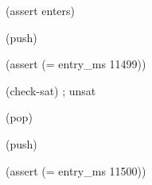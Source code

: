 \documentclass[11pt,a4paper]{article}
\begin{document}
\begin{minipage}{\linewidth}
{\begin{minipage}{\dimexpr\linewidth-2\fboxsep-2\fboxrule\relax}
\noindent{}\hspace{.8em}\parbox[t]{\dimexpr\linewidth-2.8em\relax}{\raggedright\ttfamily\fontsize{8.2}{10.5}\selectfont \hspace*{0.0em}(assert enters)\strut}\par\vspace{1pt}
\noindent{}\hspace{.8em}\parbox[t]{\dimexpr\linewidth-2.8em\relax}{\raggedright\ttfamily\fontsize{8.2}{10.5}\selectfont \hspace*{0.0em}(push)\strut}\par\vspace{1pt}
\noindent{}\hspace{.8em}\parbox[t]{\dimexpr\linewidth-2.8em\relax}{\raggedright\ttfamily\fontsize{8.2}{10.5}\selectfont \hspace*{0.0em}(assert (= entry\_ms 11499))\strut}\par\vspace{1pt}
\noindent{}\hspace{.8em}\parbox[t]{\dimexpr\linewidth-2.8em\relax}{\raggedright\ttfamily\fontsize{8.2}{10.5}\selectfont \hspace*{0.0em}(check-sat) ; unsat\strut}\par\vspace{1pt}
\noindent{}\hspace{.8em}\parbox[t]{\dimexpr\linewidth-2.8em\relax}{\raggedright\ttfamily\fontsize{8.2}{10.5}\selectfont \hspace*{0.0em}(pop)\strut}\par\vspace{1pt}
\noindent{}\hspace{.8em}\parbox[t]{\dimexpr\linewidth-2.8em\relax}{\raggedright\ttfamily\fontsize{8.2}{10.5}\selectfont \hspace*{0.0em}(push)\strut}\par\vspace{1pt}
\noindent{}\hspace{.8em}\parbox[t]{\dimexpr\linewidth-2.8em\relax}{\raggedright\ttfamily\fontsize{8.2}{10.5}\selectfont \hspace*{0.0em}(assert (= entry\_ms 11500))\strut}\par\vspace{1pt}

\end{minipage}}
\end{minipage}
\end{document}
